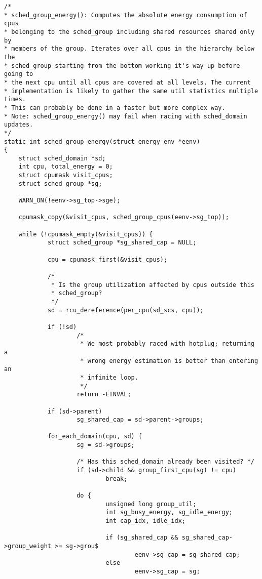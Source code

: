 \documentclass{article}
\begin{document}
\begin{verbatim}
/*
* sched_group_energy(): Computes the absolute energy consumption of cpus
* belonging to the sched_group including shared resources shared only by
* members of the group. Iterates over all cpus in the hierarchy below the
* sched_group starting from the bottom working it's way up before going to
* the next cpu until all cpus are covered at all levels. The current
* implementation is likely to gather the same util statistics multiple times.
* This can probably be done in a faster but more complex way.
* Note: sched_group_energy() may fail when racing with sched_domain updates.
*/
static int sched_group_energy(struct energy_env *eenv)
{
    struct sched_domain *sd;
    int cpu, total_energy = 0;
    struct cpumask visit_cpus;
    struct sched_group *sg;

    WARN_ON(!eenv->sg_top->sge);

    cpumask_copy(&visit_cpus, sched_group_cpus(eenv->sg_top));

    while (!cpumask_empty(&visit_cpus)) {
            struct sched_group *sg_shared_cap = NULL;

            cpu = cpumask_first(&visit_cpus);

            /*
             * Is the group utilization affected by cpus outside this
             * sched_group?
             */
            sd = rcu_dereference(per_cpu(sd_scs, cpu));

            if (!sd)
                    /*
                     * We most probably raced with hotplug; returning a
                     * wrong energy estimation is better than entering an
                     * infinite loop.
                     */
                    return -EINVAL;

            if (sd->parent)
                    sg_shared_cap = sd->parent->groups;

            for_each_domain(cpu, sd) {
                    sg = sd->groups;

                    /* Has this sched_domain already been visited? */
                    if (sd->child && group_first_cpu(sg) != cpu)
                            break;

                    do {
                            unsigned long group_util;
                            int sg_busy_energy, sg_idle_energy;
                            int cap_idx, idle_idx;

                            if (sg_shared_cap && sg_shared_cap->group_weight >= sg->grou$
                                    eenv->sg_cap = sg_shared_cap;
                            else
                                    eenv->sg_cap = sg;


\end{verbatim}
\end{document}
